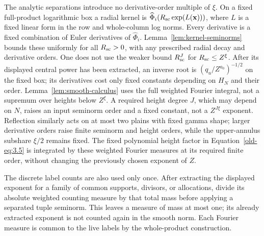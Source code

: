 \documentclass[11pt,a4paper]{article}
\numberwithin{equation}{section}
\numberwithin{figure}{section}
\theoremstyle{definition}
\theoremstyle{remark}
\begin{document}
The analytic separations introduce no derivative-order multiple of
\(\xi\).  On a fixed full-product logarithmic box a radial kernel is
\(\widehat\Phi_i(R_{\rm sc}\exp(L(\mathbf x)))\), where \(L\) is a fixed
linear form in the row and whole-column log norms.  Every derivative
is a fixed combination of Euler derivatives of \(\widehat\Phi_i\).
Lemma~\ref{lem:kernel-seminorms} bounds these uniformly for all
\(R_{\rm sc}>0\), with any prescribed radial decay and derivative orders.
One does not use the weaker bound \(R_{\rm sc}^J\) for
\(R_{\rm sc}\le Z^\xi\).
After its displayed central power has been extracted, an inverse root
is \((q_u/Z^{a_0})^{-1/2}\) on the fixed box; its derivatives cost
only fixed constants depending on \(H_N\) and their order.
Lemma~\ref{lem:smooth-calculus} uses the full weighted Fourier
integral, not a supremum over heights below \(Z^\xi\).  A required
height degree \(J\), which may depend on \(N\), raises an input
seminorm order and a fixed constant, not a \(Z^{J\xi}\) exponent.
Reflection similarly acts on at most two plains with fixed gamma
shape; larger derivative orders raise finite seminorm and height
orders, while the upper-annulus subshare \(\xi/2\) remains fixed.
The fixed polynomial height factor in Equation~\eqref{old-eq:3.5}
is integrated by these weighted Fourier measures at its required finite
order, without changing the previously chosen exponent of \(Z\).

The discrete label counts are also used only once.  After extracting
the displayed exponent for a family of common supports, divisors, or
allocations, divide its absolute weighted counting measure by that
total mass before applying a separated tuple seminorm.  This leaves a
measure of mass at most one; its already extracted exponent is not
counted again in the smooth norm.  Each Fourier measure is common to
the live labels by the whole-product construction.
\end{document}
